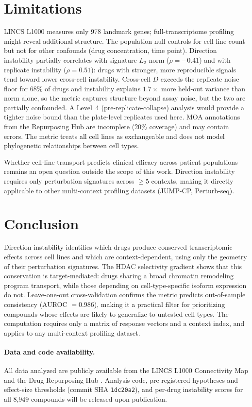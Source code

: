 \documentclass{article}
\begin{document}
\section{Limitations}

LINCS L1000 measures only 978 landmark genes; full-transcriptome
profiling might reveal additional structure. The population null
controls for cell-line count but not for other confounds (drug
concentration, time point). Direction instability partially correlates
with signature $L_2$ norm ($\rho = -0.41$) and with replicate
instability ($\rho = 0.51$): drugs with stronger, more reproducible
signals tend toward lower cross-cell instability. Cross-cell $D$
exceeds the replicate noise floor for 68\% of drugs and instability
explains $1.7\times$ more held-out variance than norm alone, so the
metric captures structure beyond assay noise, but the two are
partially confounded. A Level~4 (pre-replicate-collapse) analysis
would provide a tighter noise bound than the plate-level replicates
used here. MOA annotations from the Repurposing Hub are incomplete
(20\% coverage) and may contain errors. The metric treats all cell
lines as exchangeable and does not model phylogenetic relationships
between cell types.

Whether cell-line transport predicts clinical efficacy across patient
populations remains an open question outside the scope of this work.
Direction instability requires only perturbation signatures across
$\geq5$ contexts, making it directly applicable to other multi-context
profiling datasets (JUMP-CP, Perturb-seq).

\section{Conclusion}

Direction instability identifies which drugs produce conserved
transcriptomic effects across cell lines and which are
context-dependent, using only the geometry of their perturbation
signatures. The HDAC selectivity gradient shows that this conservation
is target-mediated: drugs sharing a broad chromatin remodeling program
transport, while those depending on cell-type-specific isoform
expression do not. Leave-one-out cross-validation confirms the metric
predicts out-of-sample consistency (AUROC $= 0.986$), making it a
practical filter for prioritizing compounds whose effects are likely
to generalize to untested cell types. The computation requires only a
matrix of response vectors and a context index, and applies to any
multi-context profiling dataset.

\paragraph{Data and code availability.} All data analyzed are publicly
available from the LINCS L1000 Connectivity Map
\citep{subramanian2017next} and the Drug Repurposing Hub
\citep{corsello2017drug}. Analysis code, pre-registered hypotheses
and effect-size thresholds (commit SHA \texttt{1dc20a2}), and
per-drug instability scores for all 8{,}949 compounds will be
released upon publication.



\end{document}
